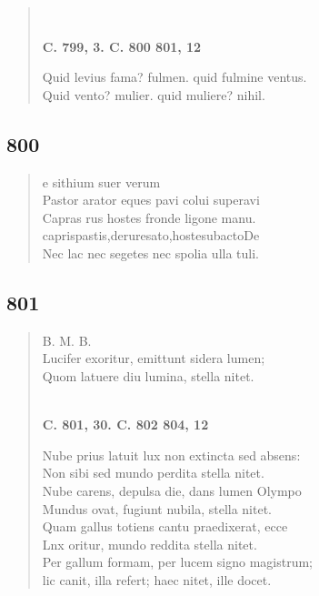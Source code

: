 \documentclass[11pt, a4paper]{report}
\begin{document}
\begin{verse}
        ﻿\pagebreak 
    \begin{center} \textbf{C. 799, 3. C. 800 801, 12} \end{center} \marginpar{[276]} Quid levius fama? fulmen. quid fulmine ventus. \\ Quid vento? mulier. quid muliere? nihil. \\ 
      \end{verse}
  
            \subsection*{800}
      \begin{verse}
      e sithium suer verum \\ Pastor arator eques pavi colui superavi \\ Capras rus hostes fronde ligone manu. \\ caprispastis,deruresato,hostesubactoDe \\ Nec lac nec segetes nec spolia ulla tuli. \\ 
      \end{verse}
  
            \subsection*{801}
      \begin{verse}
      B. M. B. \\ Lucifer exoritur, emittunt sidera lumen; \\ Quom latuere diu lumina, stella nitet. \\ 
        ﻿\pagebreak 
    \begin{center} \textbf{C. 801, 30. C. 802 804, 12} \end{center} \marginpar{[277]} Nube prius latuit lux non extincta sed absens: \\ Non sibi sed mundo perdita stella nitet. \\ Nube carens, depulsa die, dans lumen Olympo \\ Mundus ovat, fugiunt nubila, stella nitet. \\ Quam gallus totiens cantu praedixerat, ecce \\ Lnx oritur, mundo reddita stella nitet. \\ Per gallum formam, per lucem signo magistrum; \\ lic canit, illa refert; haec nitet, ille docet. \\ 
      \end{verse}
  
\end{document}
